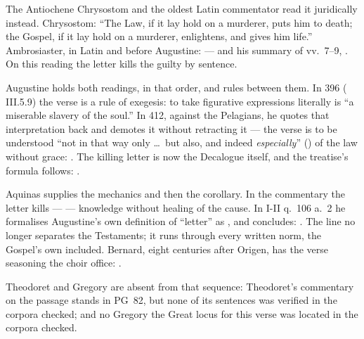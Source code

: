 The Antiochene Chrysostom and the oldest Latin commentator read it juridically
instead.
Chrysostom: ``The Law, if it lay hold on a murderer, puts him to death; the
Gospel, if it lay hold on a murderer, enlightens, and gives him life.''
Ambrosiaster, in Latin and before Augustine:  --- and his summary of vv.~7--9, . On this reading the letter kills the guilty by
sentence.

Augustine holds both readings, in that order, and rules between them. In 396
( III.5.9) the verse is a rule of exegesis: to
take figurative expressions literally is ``a miserable slavery of the soul.''
In 412, against the Pelagians, he quotes that interpretation back and demotes
it without retracting it --- the verse is to be understood ``not in that way
only \dots\ but also, and indeed \textit{especially}'' () of the law without grace: . The killing letter is now the Decalogue itself, and the
treatise's formula follows: .

Aquinas supplies the mechanics and then the corollary. In the commentary the
letter kills  ---  --- knowledge without healing of the cause. In
 I-II q.~106 a.~2 he formalises Augustine's own
definition of ``letter'' as , and concludes:
. The line no longer separates the Testaments; it runs through
every written norm, the Gospel's own included. Bernard, eight centuries after Origen,
has the verse seasoning the choir office: .

Theodoret and Gregory are absent from that sequence: Theodoret's commentary
on the passage stands in PG~82, but none of its sentences was verified in the
corpora checked; and no Gregory the Great locus for this verse was located in the corpora
checked.

